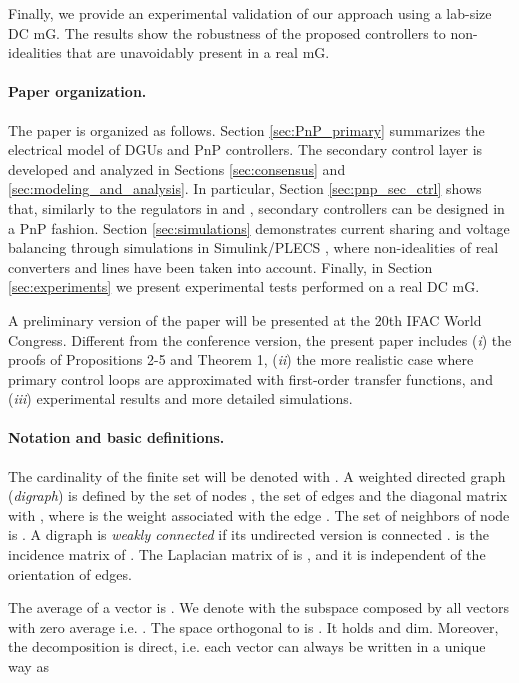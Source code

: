 \documentclass[a4paper]{article}
\theoremstyle{plain}
\begin{document}
	Finally, we provide an experimental validation of our approach using a lab-size DC mG. The results show the robustness of the proposed controllers to non-idealities that are unavoidably present in a real mG.

\paragraph{Paper organization.}	
The paper is organized as
follows. Section \ref{sec:PnP_primary} summarizes the electrical model
of DGUs and PnP controllers. The secondary control layer is developed
and analyzed in Sections \ref{sec:consensus} and
\ref{sec:modeling_and_analysis}. In particular, Section \ref{sec:pnp_sec_ctrl} shows that, similarly to the regulators in \cite{tucci2015decentralized} and \cite{tucci2016improved}, secondary controllers can be designed in a PnP fashion. Section \ref{sec:simulations} demonstrates current
sharing and voltage balancing through simulations in Simulink/PLECS
\cite{allmeling2013plecs}, where non-idealities of real converters
and lines have been taken into account. Finally, in Section \ref{sec:experiments} we present experimental tests performed on a real DC mG.

A preliminary version of the paper will be presented at the 20th IFAC World Congress. Different from the conference version, the present paper includes (\textit{i}) the proofs of Propositions 2-5 and Theorem 1, (\textit{ii}) the more realistic case where primary control loops are approximated with first-order transfer functions, and (\textit{iii}) experimental results and more detailed simulations.

\paragraph{Notation and basic definitions.} 
The cardinality of the finite set  will be denoted with . A
weighted directed graph (\emph{digraph})  is
defined by the set of nodes , the set of edges
 and the diagonal
matrix  with , where  is the weight associated with the edge . The set of neighbors of node  is . A digraph  is \textit{weakly connected} if its undirected
version is connected \cite{lns-v.85}.  is the incidence matrix of 
\cite{grone1990laplacian}. The Laplacian matrix of  is , and it is independent of the orientation of edges. 

The average of a vector  is . We denote with  the subspace composed by all vectors with zero average \cite{bensoussan2005difference,1643380} i.e. . The space orthogonal to  is . It holds  and dim. Moreover, the decomposition  is direct, i.e. each vector  can always be written in a unique way as
\end{document}
